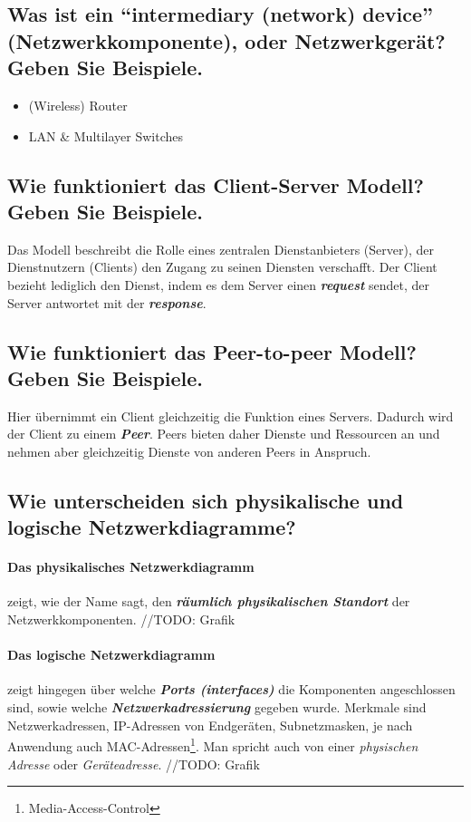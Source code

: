 \subsection*{Was ist ein ``intermediary (network) device'' (Netzwerkkomponente), oder Netzwerkgerät? Geben Sie Beispiele.}
\begin{itemize}
    \item (Wireless) Router
    \item LAN \& Multilayer Switches
\end{itemize}
\subsection*{Wie funktioniert das \flqq Client-Server\frqq{} Modell? Geben Sie Beispiele.}
Das Modell beschreibt die Rolle eines zentralen Dienstanbieters (Server), der Dienstnutzern (Clients) den Zugang zu seinen Diensten verschafft. Der Client bezieht lediglich den Dienst, indem es dem Server einen \textsl{\textbf{request}} sendet, der Server antwortet mit der \textsl{\textbf{response}}.
\subsection*{Wie funktioniert das \flqq Peer-to-peer\frqq{} Modell? Geben Sie Beispiele.}
Hier übernimmt ein Client gleichzeitig die Funktion eines Servers. Dadurch wird der Client zu einem \textsl{\textbf{Peer}}. Peers bieten daher Dienste und Ressourcen an und nehmen aber gleichzeitig Dienste von anderen Peers in Anspruch.
\subsection*{Wie unterscheiden sich physikalische und logische Netzwerkdiagramme?}
\paragraph{Das physikalisches Netzwerkdiagramm}zeigt, wie der Name sagt, den \textsl{\textbf{räumlich physikalischen Standort}} der Netzwerkkomponenten. //TODO: Grafik
\paragraph{Das logische Netzwerkdiagramm}zeigt hingegen über welche \textsl{\textbf{Ports (interfaces)}} die Komponenten angeschlossen sind, sowie welche \textsl{\textbf{Netzwerkadressierung}} gegeben wurde. Merkmale sind Netzwerkadressen, IP-Adressen von Endgeräten, Subnetzmasken, je nach Anwendung auch MAC-Adressen\footnote{Media-Access-Control}. Man spricht auch von einer \textsl{physischen Adresse} oder \textsl{Geräteadresse}. //TODO: Grafik
